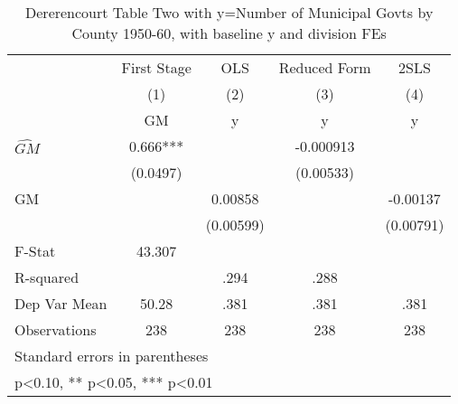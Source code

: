 \begin{table}[htbp]\centering
\def\sym#1{\ifmmode^{#1}\else\(^{#1}\)\fi}
\caption{Dererencourt Table Two with y=Number of Municipal Govts by County 1950-60, with baseline y and division FEs}
\begin{tabular}{l*{4}{c}}
\toprule
                    & First Stage   &         OLS   &Reduced Form   &        2SLS   \\
                    &\multicolumn{1}{c}{(1)}&\multicolumn{1}{c}{(2)}&\multicolumn{1}{c}{(3)}&\multicolumn{1}{c}{(4)}\\
                    &\multicolumn{1}{c}{GM}&\multicolumn{1}{c}{y}&\multicolumn{1}{c}{y}&\multicolumn{1}{c}{y}\\
\midrule
$\hat{GM}$          &       0.666***&               &   -0.000913   &               \\
                    &    (0.0497)   &               &   (0.00533)   &               \\
\addlinespace
GM                  &               &     0.00858   &               &    -0.00137   \\
                    &               &   (0.00599)   &               &   (0.00791)   \\
\midrule
F-Stat              &      43.307   &               &               &               \\
R-squared           &               &        .294   &        .288   &               \\
Dep Var Mean        &       50.28   &        .381   &        .381   &        .381   \\
Observations        &         238   &         238   &         238   &         238   \\
\bottomrule
\multicolumn{5}{l}{\footnotesize Standard errors in parentheses}\\
\multicolumn{5}{l}{\footnotesize * p<0.10, ** p<0.05, *** p<0.01}\\
\end{tabular}
\end{table}
